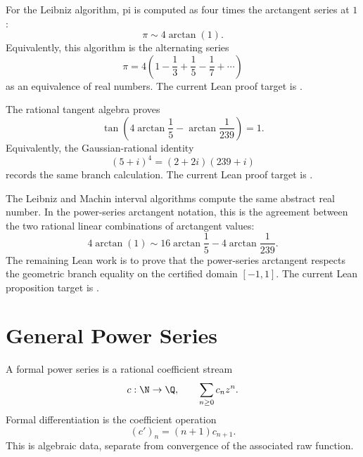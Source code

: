 \begin{theorem}\label{thm:leibniz-arctan}
For the Leibniz algorithm, pi is computed as four times the arctangent series
at \(1\):
\[
  \pi \sim 4\arctan(1).
\]
Equivalently, this algorithm is the alternating series
\[
  \pi
  =
  4\left(1-\frac13+\frac15-\frac17+\cdots\right)
\]
as an equivalence of real numbers.
The current Lean proof target is
.
\end{theorem}

\begin{theorem}\label{thm:machin-tangent}
The rational tangent algebra proves
\[
  \tan\!\left(4\arctan\frac15-\arctan\frac{1}{239}\right)=1.
\]
Equivalently, the Gaussian-rational identity
\[
  (5+i)^4=(2+2i)(239+i)
\]
records the same branch calculation.
The current Lean proof target is
.
\end{theorem}

\begin{theorem}\label{thm:leibniz-machin}
The Leibniz and Machin interval algorithms compute the same abstract real
number.  In the power-series arctangent notation, this is the agreement
between the two rational linear combinations of arctangent values:
\[
  4\arctan(1) \sim 16\arctan\frac15-4\arctan\frac{1}{239}.
\]
The remaining Lean work is to prove that the power-series arctangent respects
the geometric branch equality on the certified domain \([-1,1]\).
The current Lean proposition target is
.
\end{theorem}

\section{General Power Series}

\begin{definition}
\label{def:formal-power-series}
A formal power series is a rational coefficient stream
\[
  c:\N\to\Q,\qquad \sum_{n\ge0}c_nz^n.
\]
Formal differentiation is the coefficient operation
\[
  (c')_n=(n+1)c_{n+1}.
\]
This is algebraic data, separate from convergence of the associated raw
function.
\end{definition}

